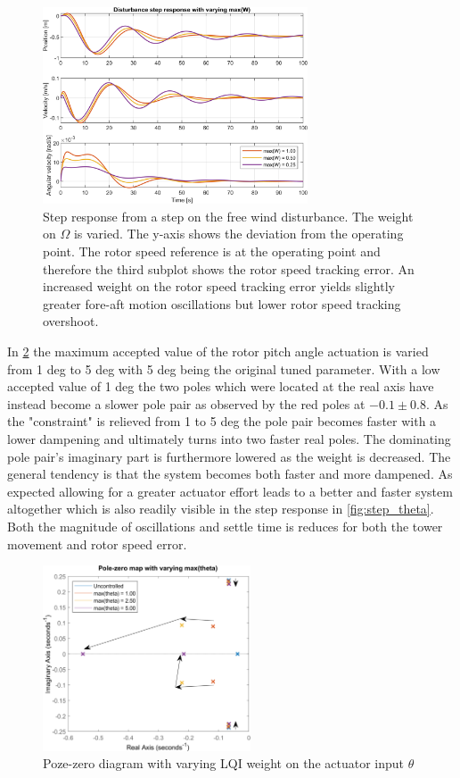 \begin{figure}[ht]
	\centering
	\includegraphics[width=0.7\textwidth]{Graphics/LQI pole zero/103_step_W.png}
	\caption{Step response from a step on the free wind disturbance. The weight on $ \Omega $ is varied. The y-axis shows the deviation from the operating point. The rotor speed reference is at the operating point and therefore the third subplot shows the rotor speed tracking error. An increased weight on the rotor speed tracking error yields slightly greater fore-aft motion oscillations but lower rotor speed tracking overshoot.}
	\label{fig:step_W}
\end{figure}

In \cref{fig:pzmap_theta} the maximum accepted value of the rotor pitch angle actuation is varied from 1 deg to 5 deg with 5 deg being the original tuned parameter. With a low accepted value of 1 deg the two poles which were located at the real axis have instead become a slower pole pair as observed by the red poles at $ -0.1 \pm0.8 $. As the "constraint" is relieved from 1 to 5 deg the pole pair becomes faster with a lower dampening and ultimately turns into two faster real poles. The dominating pole pair's imaginary part is furthermore lowered as the weight is decreased. The general tendency is that the system becomes both faster and more dampened. As expected allowing for a greater actuator effort leads to a better and faster system altogether which is also readily visible in the step response in \cref{fig:step_theta}. Both the magnitude of oscillations and settle time is reduces for both the tower movement and rotor speed error.
\begin{figure}[ht]
	\centering
	\includegraphics[width=0.55\textwidth]{Graphics/LQI pole zero/05_pzmap_theta.png}
	\caption{Poze-zero diagram with varying LQI weight on the actuator input $ \theta $}
	\label{fig:pzmap_theta}
\end{figure}

